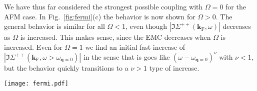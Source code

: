 \documentclass[aps, prb, twocolumn,amsmath,amssymb,floatfix]{revtex4-2}
\begin{document}
We have thus far considered the strongest possible coupling with $\Omega = 0$ for the AFM case. In Fig.~\ref{fig:fermi}(c) the behavior is now shown for $\Omega > 0$. The general behavior is similar for all $\Omega < 1$, even though $|\Im\Sigma^{++}(\boldsymbol{k}_{\textrm{F}}, \omega)|$ decreases as $\Omega$ is increased. This makes sense, since the EMC decreases when $\Omega$ is increased. Even for $\Omega = 1$ we find an initial fast increase of $|\Im\Sigma^{++}(\boldsymbol{k}_{\textrm{F}}, \omega>\omega_{\boldsymbol{q}=0})|$ in the sense that is goes like $(\omega-\omega_{\boldsymbol{q}=0})^\nu$ with $\nu <1$, but the behavior quickly transitions to a $\nu > 1$ type of increase.



\begin{figure*}
    \centering
    \texttt{[image: fermi.pdf]}
    \caption{$\Im\Sigma^{++}(\boldsymbol{k}_{\textrm{F}}, \omega)$ for the (a) TI/FM and (b) TI/AFM heterostructure, with the same parameters as those in Fig.~\ref{fig:sigma} except that we vary $K$. One can clearly see that the quick increase in $|\Im\Sigma^{++}(\boldsymbol{k}_{\textrm{F}}, \omega)|$ sets in at $|\omega| = \omega_{\boldsymbol{q} = 0} = \omega_0$, i.e., at the gap in the magnon spectrum. This is shown by the upper ticks, where the color indicates the corresponding curve. (c) $\Im\Sigma^{++}(\boldsymbol{k}_{\textrm{F}}, \omega)$ for the TI/AFM heterostructure with $K = J_1/10^3$, varying $\Omega$, and otherwise the same parameters as those in Fig.~\ref{fig:sigma}. We see that any $\Omega<1$ shows the same behavior as $\Omega = 0$, except that the effect is weaker, in the sense that $|\Im\Sigma^{++}(\boldsymbol{k}_{\textrm{F}}, \omega)|$ is smaller at the same value of $\omega$. }
    \label{fig:fermi}
\end{figure*}
\end{document}
